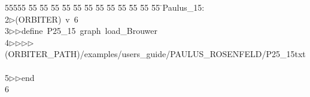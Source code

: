 %
%
\begin{tabbing}
55555 \= 55 \= 55 \= 55 \= 55 \= 55 \= 55 \= 55 \= 55 \= 55 \= 55 \= 55 \= 55 \= \>Paulus\_15:\\[0pt]
2\>$\triangleright$\>(ORBITER)\ v\ 6\ \\[0pt]
3\>$\triangleright$\>$\triangleright$\>define\ P25\_15\ graph\ load\_Brouwer\ \\[0pt]
4\>$\triangleright$\>$\triangleright$\>$\triangleright$\>$\triangleright$\>(ORBITER\_PATH)/examples/users\_guide/PAULUS\_ROSENFELD/P25\_15txt\ \\[0pt]
5\>$\triangleright$\>$\triangleright$\>end\\[0pt]
6\>\end{tabbing}

